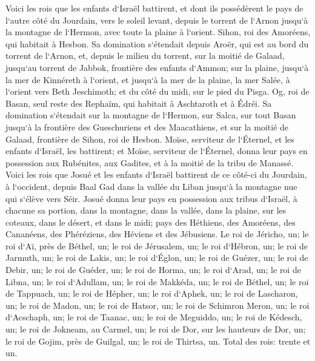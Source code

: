 \verse Voici les rois que les enfants d`Israël battirent, et dont ils possédèrent le pays de l`autre côté du Jourdain, vers le soleil levant, depuis le torrent de l`Arnon jusqu`à la montagne de l`Hermon, avec toute la plaine à l`orient. 
\verse Sihon, roi des Amoréens, qui habitait à Hesbon. Sa domination s`étendait depuis Aroër, qui est au bord du torrent de l`Arnon, et, depuis le milieu du torrent, sur la moitié de Galaad, jusqu`au torrent de Jabbok, frontière des enfants d`Ammon; 
\verse sur la plaine, jusqu`à la mer de Kinnéreth à l`orient, et jusqu`à la mer de la plaine, la mer Salée, à l`orient vers Beth Jeschimoth; et du côté du midi, sur le pied du Pisga. 
\verse Og, roi de Basan, seul reste des Rephaïm, qui habitait à Aschtaroth et à Édréi. 
\verse Sa domination s`étendait sur la montagne de l`Hermon, sur Salca, sur tout Basan jusqu`à la frontière des Gueschuriens et des Maacathiens, et sur la moitié de Galaad, frontière de Sihon, roi de Hesbon. 
\verse Moïse, serviteur de l`Éternel, et les enfants d`Israël, les battirent; et Moïse, serviteur de l`Éternel, donna leur pays en possession aux Rubénites, aux Gadites, et à la moitié de la tribu de Manassé. 
\verse Voici les rois que Josué et les enfants d`Israël battirent de ce côté-ci du Jourdain, à l`occident, depuis Baal Gad dans la vallée du Liban jusqu`à la montagne nue qui s`élève vers Séir. Josué donna leur pays en possession aux tribus d`Israël, à chacune sa portion, 
\verse dans la montagne, dans la vallée, dans la plaine, sur les coteaux, dans le désert, et dans le midi; pays des Héthiens, des Amoréens, des Cananéens, des Phéréziens, des Héviens et des Jébusiens. 
\verse Le roi de Jéricho, un; le roi d`Aï, près de Béthel, un; 
\verse le roi de Jérusalem, un; le roi d`Hébron, un; 
\verse le roi de Jarmuth, un; le roi de Lakis, un; 
\verse le roi d`Églon, un; le roi de Guézer, un; 
\verse le roi de Debir, un; le roi de Guéder, un; 
\verse le roi de Horma, un; le roi d`Arad, un; 
\verse le roi de Libna, un; le roi d`Adullam, un; 
\verse le roi de Makkéda, un; le roi de Béthel, un; 
\verse le roi de Tappuach, un; le roi de Hépher, un; 
\verse le roi d`Aphek, un; le roi de Lascharon, un; 
\verse le roi de Madon, un; le roi de Hatsor, un; 
\verse le roi de Schimron Meron, un; le roi d`Acschaph, un; 
\verse le roi de Taanac, un; le roi de Meguiddo, un; 
\verse le roi de Kédesch, un; le roi de Jokneam, au Carmel, un; 
\verse le roi de Dor, sur les hauteurs de Dor, un; le roi de Gojim, près de Guilgal, un; 
\verse le roi de Thirtsa, un. Total des rois: trente et un. 

